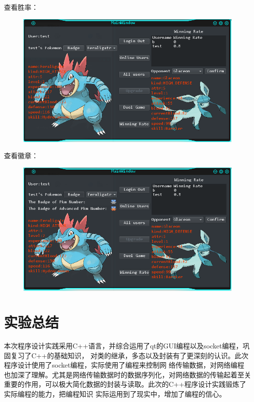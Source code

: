 \documentclass{ctexart}
\begin{document}
\pagebreak[4]
查看胜率：
\begin{figure}[H]
  \centering
  \includegraphics[width=15cm]{stage3-winningRate.png}
\end{figure}
查看徽章：
\begin{figure}[H]
  \centering
  \includegraphics[width=15cm]{stage3-badge.png}
\end{figure}

\section{实验总结}
本次程序设计实践采用C++语言，并综合运用了qt的GUI编程以及socket编程，巩固复习了C++的基础知识，
对类的继承，多态以及封装有了更深刻的认识。此次程序设计使用了socket编程，实际使用了编程来控制网
络传输数据，对网络编程也加深了理解。尤其是网络传输数据时的数据序列化，对网络数据的传输起着至关
重要的作用，可以极大简化数据的封装与读取。此次的C++程序设计实践锻炼了实际编程的能力，把编程知识
实际运用到了现实中，增加了编程的信心。
\end{document}
